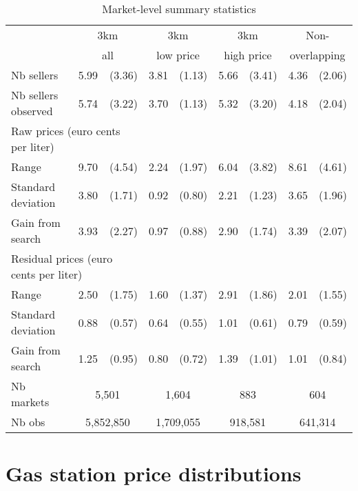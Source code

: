 \documentclass[english]{article}
\begin{document}
\begin{table}[H]
  \caption{Market-level summary statistics}
\begin{tabular}{lrrrrrrrr}
\hline
\hline
      & \multicolumn{2}{c}{3km}    & \multicolumn{2}{c}{3km}       & \multicolumn{2}{c}{3km}        & \multicolumn{2}{c}{Non-} \\
      & \multicolumn{2}{c}{all}    & \multicolumn{2}{c}{low price} & \multicolumn{2}{c}{high price} & \multicolumn{2}{c}{overlapping} \\
\hline
Nb sellers & 5.99  & (3.36) & 3.81  & (1.13) & 5.66  & (3.41) & 4.36  & (2.06) \\
Nb sellers observed & 5.74  & (3.22) & 3.70  & (1.13) & 5.32  & (3.20) & 4.18  & (2.04) \\
\hline
\multicolumn{3}{l}{Raw prices (euro cents per liter)}          &       &       &       &       &       &  \\
Range & 9.70  & (4.54) & 2.24  & (1.97) & 6.04  & (3.82) & 8.61  & (4.61) \\
Standard deviation & 3.80  & (1.71) & 0.92  & (0.80) & 2.21  & (1.23) & 3.65  & (1.96) \\
Gain from search & 3.93  & (2.27) & 0.97  & (0.88) & 2.90  & (1.74) & 3.39  & (2.07) \\
\hline
\multicolumn{3}{l}{Residual prices (euro cents per liter)}      &       &       &       &       &       &  \\
Range & 2.50  & (1.75) & 1.60  & (1.37) & 2.91  & (1.86) & 2.01  & (1.55) \\
Standard deviation & 0.88  & (0.57) & 0.64  & (0.55) & 1.01  & (0.61) & 0.79  & (0.59) \\
Gain from search & 1.25  & (0.95) & 0.80  & (0.72) & 1.39  & (1.01) & 1.01  & (0.84) \\
\hline
Nb markets & \multicolumn{2}{c}{5,501} & \multicolumn{2}{c}{1,604} & \multicolumn{2}{c}{883} & \multicolumn{2}{c}{604} \\
Nb obs     & \multicolumn{2}{c}{5,852,850} & \multicolumn{2}{c}{1,709,055} & \multicolumn{2}{c}{918,581} & \multicolumn{2}{c}{641,314} \\
\hline
\hline
\end{tabular}
\label{tab:stats_des_markets}
\end{table}

\section{Gas station price distributions}
\end{document}
